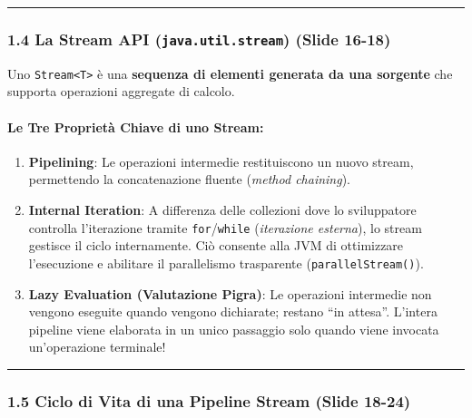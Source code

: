 \documentclass[11pt,a4paper]{article}
\newcommand{\passthrough}[1]{#1}
\providecommand{\tightlist}{\setlength{\itemsep}{0pt}\setlength{\parskip}{0pt}}
\begin{document}
\begin{center}\rule{0.5\linewidth}{0.5pt}\end{center}

\subsubsection{\texorpdfstring{1.4 La Stream API
(\texttt{java.util.stream}) (Slide
16-18)}{1.4 La Stream API (java.util.stream) (Slide 16-18)}}\label{la-stream-api-java.util.stream-slide-16-18}

Uno \passthrough{\lstinline!Stream<T>!} è una \textbf{sequenza di
elementi generata da una sorgente} che supporta operazioni aggregate di
calcolo.

\paragraph{Le Tre Proprietà Chiave di uno
Stream:}\label{le-tre-proprietuxe0-chiave-di-uno-stream}

\begin{enumerate}
\def\labelenumi{\arabic{enumi}.}
\tightlist
\item
  \textbf{Pipelining}: Le operazioni intermedie restituiscono un nuovo
  stream, permettendo la concatenazione fluente (\emph{method
  chaining}).
\item
  \textbf{Internal Iteration}: A differenza delle collezioni dove lo
  sviluppatore controlla l'iterazione tramite
  \passthrough{\lstinline!for!}/\passthrough{\lstinline!while!}
  (\emph{iterazione esterna}), lo stream gestisce il ciclo internamente.
  Ciò consente alla JVM di ottimizzare l'esecuzione e abilitare il
  parallelismo trasparente (\passthrough{\lstinline!parallelStream()!}).
\item
  \textbf{Lazy Evaluation (Valutazione Pigra)}: Le operazioni intermedie
  non vengono eseguite quando vengono dichiarate; restano ``in attesa''.
  L'intera pipeline viene elaborata in un unico passaggio solo quando
  viene invocata un'operazione terminale!
\end{enumerate}

\begin{center}\rule{0.5\linewidth}{0.5pt}\end{center}

\subsubsection{1.5 Ciclo di Vita di una Pipeline Stream (Slide
18-24)}\label{ciclo-di-vita-di-una-pipeline-stream-slide-18-24}
\end{document}
